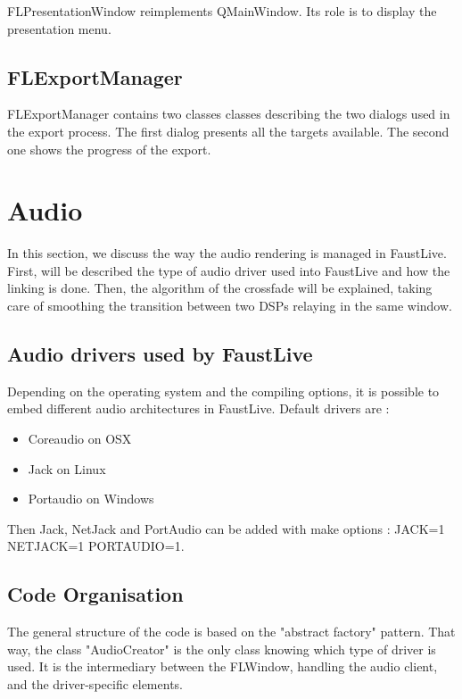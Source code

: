 \documentclass[a4paper]{article}
\begin{document}
{FLPresentationWindow reimplements QMainWindow. Its role is to display the presentation menu.

\subsection{FLExportManager}

FLExportManager contains two classes classes describing the two dialogs used in the export process. The first dialog presents all the targets available. The second one shows the progress of the export.

\section{Audio \label{Audio}}

In this section, we discuss the way the audio rendering is managed in FaustLive. 
First, will be described the type of audio driver used into FaustLive and how the linking is done. Then, the algorithm of the crossfade will be explained, taking care of smoothing the transition between two DSPs relaying in the same window. 

\subsection{Audio drivers used by FaustLive}
 
Depending on the operating system and the compiling options, it is possible to embed different audio architectures in FaustLive.
Default drivers are :
\begin{itemize}
\item Coreaudio on OSX
\item Jack on Linux
\item Portaudio on Windows
\end{itemize}

Then Jack, NetJack and PortAudio can be added with make options : JACK=1 NETJACK=1 PORTAUDIO=1.

\subsection{Code Organisation}

The general structure of the code is based on the "abstract factory" pattern. That way, the class "AudioCreator" is the only class knowing which type of driver is used. It is the intermediary between the FLWindow, handling the audio client, and the driver-specific elements.  \\

}
\end{document}
